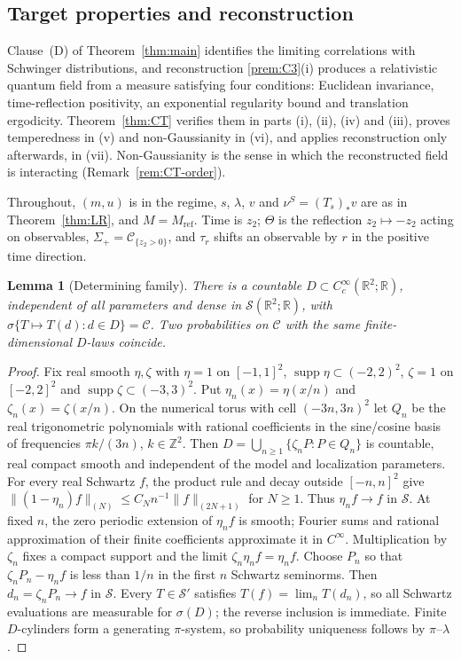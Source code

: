 \documentclass[11pt]{article}
\theoremstyle{plain}
\newtheorem{lemma}[theorem]{Lemma}
\theoremstyle{definition}
\theoremstyle{remark}
\newcommand{\R}{\mathbb{R}}
\newcommand{\Z}{\mathbb{Z}}
\newcommand{\cC}{\mathcal{C}}
\newcommand{\cS}{\mathcal{S}}
\DeclareMathOperator{\supp}{supp}
\begin{document}
\subsection{Target properties and reconstruction}\label{sec:CT}

Clause~(D) of Theorem~\ref{thm:main} identifies the limiting correlations with Schwinger distributions, and reconstruction \ref{prem:C3}(i) produces a relativistic quantum field from a measure satisfying four conditions: Euclidean invariance, time-reflection positivity, an exponential regularity bound and translation ergodicity. Theorem~\ref{thm:CT} verifies them in parts (i), (ii), (iv) and (iii), proves temperedness in (v) and non-Gaussianity in (vi), and applies reconstruction only afterwards, in (vii). Non-Gaussianity is the sense in which the reconstructed field is interacting (Remark~\ref{rem:CT-order}).

Throughout, $(m,u)$ is in the regime, $s$, $\lambda$, $v$ and $\nu^{S}=(T_s)_*v$ are as in
Theorem~\ref{thm:LR}, and $M=M_{\mathrm{ref}}$. Time is $z_2$; $\Theta$ is the reflection
$z_2\mapsto-z_2$ acting on observables, $\Sigma_+=\cC_{\{z_2>0\}}$, and $\tau_r$ shifts an
observable by $r$ in the positive time direction.

\begin{lemma}[Determining family]\label{lem:determining}
There is a countable $D\subset C_c^\infty(\R^2;\R)$, independent of all
parameters and dense in $\cS(\R^2;\R)$, with
$\sigma\{T\mapsto T(d):d\in D\}=\cC$. Two probabilities on $\cC$ with
the same finite-dimensional $D$-laws coincide.
\end{lemma}
\begin{proof}
Fix real smooth $\eta,\zeta$ with $\eta=1$ on $[-1,1]^2$,
$\supp\eta\subset(-2,2)^2$, $\zeta=1$ on $[-2,2]^2$ and
$\supp\zeta\subset(-3,3)^2$. Put $\eta_n(x)=\eta(x/n)$ and
$\zeta_n(x)=\zeta(x/n)$. On the numerical torus with cell $(-3n,3n)^2$
let $Q_n$ be the real trigonometric polynomials with rational coefficients
in the sine/cosine basis of frequencies $\pi k/(3n)$, $k\in\Z^2$. Then
$D=\bigcup_{n\ge1}\{\zeta_n P:P\in Q_n\}$ is countable, real compact
smooth and independent of the model and localization parameters.
For every real Schwartz $f$, the product rule and decay outside $[-n,n]^2$
give $\|(1-\eta_n)f\|_{(N)}\le C_N n^{-1}\|f\|_{(2N+1)}$ for $N\ge1$.
Thus $\eta_n f\to f$ in $\cS$. At fixed $n$, the zero periodic extension
of $\eta_n f$ is smooth; Fourier sums and rational approximation of their
finite coefficients approximate it in $C^\infty$. Multiplication by
$\zeta_n$ fixes a compact support and the limit $\zeta_n\eta_n f=\eta_n f$.
Choose $P_n$ so that $\zeta_nP_n-\eta_nf$ is less than $1/n$ in the first
$n$ Schwartz seminorms. Then $d_n=\zeta_nP_n\to f$ in $\cS$.
Every $T\in\cS'$ satisfies $T(f)=\lim_nT(d_n)$, so all Schwartz evaluations
are measurable for $\sigma(D)$; the reverse inclusion is immediate.
Finite $D$-cylinders form a generating $\pi$-system, so probability
uniqueness follows by $\pi$--$\lambda$.
\end{proof}
\end{document}
